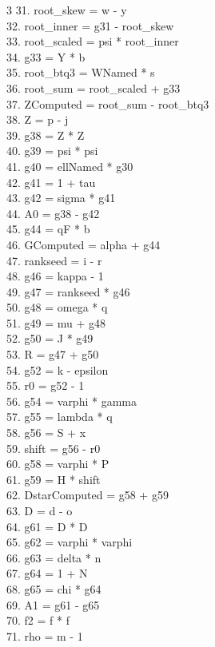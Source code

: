 \documentclass[10pt]{article}
\begin{document}
\begin{multicols}{3}
31. root\_skew = w - y\\
32. root\_inner = g31 - root\_skew\\
33. root\_scaled = psi * root\_inner\\
34. g33 = Y * b\\
35. root\_btq3 = WNamed * s\\
36. root\_sum = root\_scaled + g33\\
37. ZComputed = root\_sum - root\_btq3\\
38. Z = p - j\\
39. g38 = Z * Z\\
40. g39 = psi * psi\\
41. g40 = ellNamed * g30\\
42. g41 = 1 + tau\\
43. g42 = sigma * g41\\
44. A0 = g38 - g42\\
45. g44 = qF * b\\
46. GComputed = alpha + g44\\
47. rankseed = i - r\\
48. g46 = kappa - 1\\
49. g47 = rankseed * g46\\
50. g48 = omega * q\\
51. g49 = mu + g48\\
52. g50 = J * g49\\
53. R = g47 + g50\\
54. g52 = k - epsilon\\
55. r0 = g52 - 1\\
56. g54 = varphi * gamma\\
57. g55 = lambda * q\\
58. g56 = S + x\\
59. shift = g56 - r0\\
60. g58 = varphi * P\\
61. g59 = H * shift\\
62. DstarComputed = g58 + g59\\
63. D = d - o\\
64. g61 = D * D\\
65. g62 = varphi * varphi\\
66. g63 = delta * n\\
67. g64 = 1 + N\\
68. g65 = chi * g64\\
69. A1 = g61 - g65\\
70. f2 = f * f\\
71. rho = m - 1\\

\end{multicols}
\end{document}
